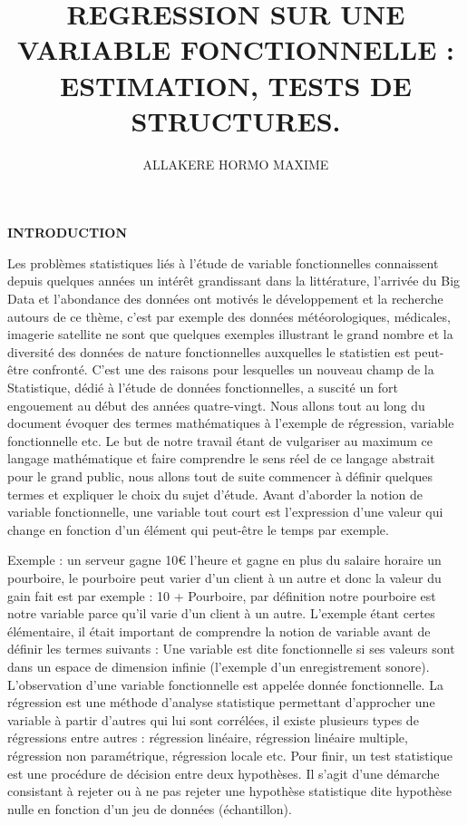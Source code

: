 \documentclass[12pt,a4paper]{article}
\author{ALLAKERE HORMO MAXIME}
\title{REGRESSION SUR UNE VARIABLE FONCTIONNELLE : ESTIMATION, TESTS DE STRUCTURES.}
\begin{document}
\lipsum[1-4]
\maketitle
\begin{center}
\textbf{INTRODUCTION}
\end{center}


Les problèmes statistiques liés à l'étude de variable fonctionnelles connaissent depuis quelques années un intérêt grandissant dans la littérature, l’arrivée du Big Data  et l’abondance des données ont motivés le développement et la recherche autours de ce thème, c’est par exemple des données météorologiques, médicales, imagerie satellite ne sont que quelques exemples illustrant le grand nombre et la diversité des données de nature fonctionnelles auxquelles le statistien est peut-être confronté. C’est une des raisons pour lesquelles un nouveau champ de la Statistique, dédié à l’étude de données fonctionnelles, a suscité un fort engouement au début des années quatre-vingt.
Nous allons tout au long du document évoquer des termes mathématiques à l’exemple de régression, variable fonctionnelle etc. Le but de notre travail étant de vulgariser au maximum ce langage mathématique et faire comprendre le sens réel de ce langage abstrait pour le grand public, nous allons tout de suite commencer à définir quelques termes et expliquer le choix du sujet d’étude.
Avant d’aborder la notion de variable fonctionnelle, une variable tout court est l’expression d’une valeur qui change en fonction d’un élément qui peut-être le temps par exemple.

Exemple : un serveur gagne 10€ l’heure et gagne en plus du salaire horaire un pourboire, le pourboire peut varier d’un client à un autre et donc la valeur du gain fait est par exemple : 10 + Pourboire, par définition notre pourboire est notre variable parce qu’il varie d’un client à un autre.
L’exemple étant certes élémentaire, il était important de comprendre la notion de variable avant de définir les termes suivants :
Une variable est dite fonctionnelle si ses valeurs sont dans un espace de dimension infinie (l’exemple d’un enregistrement sonore).
L’observation d’une variable fonctionnelle est appelée donnée fonctionnelle.
La régression est une méthode d’analyse statistique permettant d’approcher une variable à partir d’autres qui lui sont corrélées, il existe plusieurs types de régressions entre autres : régression linéaire, régression linéaire multiple, régression non paramétrique, régression locale etc.
Pour finir, un test statistique est une procédure de décision entre deux hypothèses. Il s’agit d’une démarche consistant à rejeter ou à ne pas rejeter une hypothèse statistique dite hypothèse nulle en fonction d’un jeu de données (échantillon).
\end{document}
